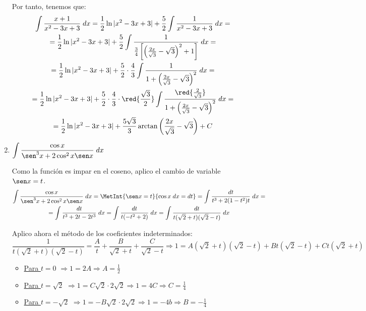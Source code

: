 \begin{ejercicio}
\begin{enumerate}
    Por tanto, tenemos que:
    \begin{multline*}
        \int \frac{x+1}{x^2-3x+3}\;dx =\frac{1}{2}\ln|x^2-3x+3|+\frac{5}{2}\int \frac{1}{x^2-3x+3}\;dx
        =\\=
        \frac{1}{2}\ln|x^2-3x+3|+\frac{5}{2}\int \frac{1}{\frac{3}{4}\left[\left(\frac{2x}{\sqrt{3}}-\sqrt{3}\right)^2+1\right]}\;dx
        =\\=
        \frac{1}{2}\ln|x^2-3x+3|+\frac{5}{2}\cdot \frac{4}{3}\int \frac{1}{1+\left(\frac{2x}{\sqrt{3}}-\sqrt{3}\right)^2}\;dx
        =\\=
        \frac{1}{2}\ln|x^2-3x+3|+\frac{5}{2}\cdot \frac{4}{3}\cdot \red{\frac{\sqrt{3}}{2}}\int \frac{\red{\frac{2}{\sqrt{3}}}}{1+\left(\frac{2x}{\sqrt{3}}-\sqrt{3}\right)^2}\;dx
        =\\=
        \frac{1}{2}\ln|x^2-3x+3|+\frac{5\sqrt{3}}{3} \arctan \left(\frac{2x}{\sqrt{3}}-\sqrt{3}\right) + C
    \end{multline*}

    \item $\displaystyle \int \frac{\cos x}{\sen^3x +2\cos^2x\sen x}\;dx$

    Como la función es impar en el coseno, aplico el cambio de variable $\sen x = t$.
    \begin{multline*}
        \int \frac{\cos x}{\sen^3x +2\cos^2x\sen x}\;dx = \MetInt{\sen x= t}{\cos x \;dx = dt} = 
        \int \frac{dt}{t^3 +2(1-t^2)t}\;dx
        =\\= 
        \int \frac{dt}{t^3 +2t-2t^3}\;dx
        = 
        \int \frac{dt}{t(-t^2+2)}\;dx
        = 
        \int \frac{dt}{t(\sqrt{2}+t)(\sqrt{2}-t)}\;dx
    \end{multline*}

    Aplico ahora el método de los coeficientes indeterminados:
    \begin{equation*}
        \frac{1}{t(\sqrt{2}+t)(\sqrt{2}-t)} = \frac{A}{t} + \frac{B}{\sqrt{2}+t} + \frac{C}{\sqrt{2}-t} \Longrightarrow 1=A(\sqrt{2}+t)(\sqrt{2}-t) + Bt(\sqrt{2}-t) + Ct(\sqrt{2}+t)
    \end{equation*}
    \begin{itemize}
        \item \underline{Para $t=0$} $\Longrightarrow 1=2A\Longrightarrow A=\frac{1}{2}$
        \item \underline{Para $t=\sqrt{2}$} $\Longrightarrow 1=C\sqrt{2}\cdot 2\sqrt{2}\Longrightarrow 1=4C\Longrightarrow C=\frac{1}{4}$
        \item \underline{Para $t=-\sqrt{2}$} $\Longrightarrow 1=-B\sqrt{2}\cdot 2\sqrt{2}\Longrightarrow 1=-4b\Longrightarrow B=-\frac{1}{4}$
    \end{itemize}


\end{enumerate}
\end{ejercicio}
